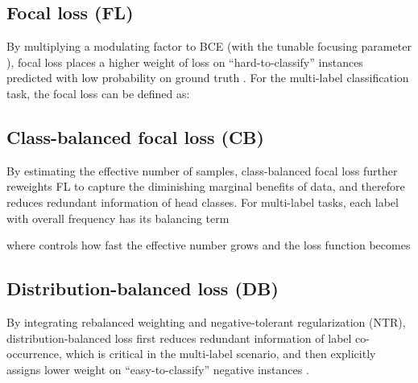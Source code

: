 \documentclass[11pt]{article}
\begin{document}
\begin{comment}

\small

\normalsize

\end{comment}


\subsection{Focal loss (FL)}
By multiplying a modulating factor to BCE (with the tunable focusing parameter ), focal loss places a higher weight of loss on “hard-to-classify” instances predicted with low probability on ground truth \citep{lin2017focal}.
For the multi-label classification task, the focal loss can be defined as:


\small
  
\normalsize

\begin{comment}
\small

\normalsize
\end{comment}

\subsection{Class-balanced focal loss (CB)}
By estimating the effective number of samples, class-balanced focal loss \citep{class-balanced-loss} further reweights FL to capture the diminishing marginal benefits of data, and therefore reduces redundant information of head classes.
For multi-label tasks, each label with overall frequency  has its balancing term

\small

\normalsize

where 
 controls how fast the effective number grows
and the loss function becomes

\begin{comment}
\small

\normalsize
\end{comment}


\small
  
\normalsize


\subsection{Distribution-balanced loss (DB)}
By integrating rebalanced weighting and negative-tolerant regularization (NTR), distribution-balanced loss first reduces redundant information of label co-occurrence, which is critical in the multi-label scenario, and then explicitly assigns lower weight on “easy-to-classify” negative instances \citep{DBLoss}.
\end{document}
